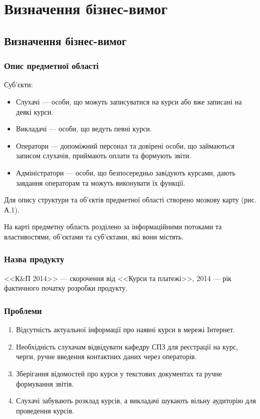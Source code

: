 \newpage
\section{Визначення бізнес-вимог}
\subsection{Визначення бізнес-вимог}
\subsubsection{Опис предметної області}
\bigbreak
Суб'єкти:

\begin{itemize}
\item Слухачі --- особи, що можуть записуватися на курси або вже записані на деякі курси.
\item Викладачі --- особи, що ведуть певні курси.
\item Оператори --- допоміжний персонал та довірені особи, що займаються записом слухачів, приймають оплати та формують звіти.
\item Адміністратори --- особи, що безпосередньо завідують курсами, дають завдання операторам та можуть виконувати їх функції.
\end{itemize}

Для опису структури та об'єктів предметної області створено мозкову карту (рис. А.1).

На карті предметну область розділено за інформаційними потоками та властивостями, об'єктами та суб'єктами, які вони містять.
\bigbreak
\subsubsection{Назва продукту}
\bigbreak
<<К\&П 2014>> --- скорочення від <<Курси та платежі>>, 2014 --- рік фактичного початку розробки продукту.
\bigbreak
\subsubsection{Проблеми}
\bigbreak
\begin{enumerate}
 \item Відсутність актуальної інформації про наявні курси в мережі Інтернет.
 \item Необхідність слухачам відвідувати кафедру СПЗ для реєстрації на курс, черги, ручне введення контактних даних через операторів.
 \item Зберігання відомостей про курси у текстових документах та ручне формування звітів.
 \item Слухачі забувають розклад курсів, а викладачі шукають вільну аудиторію для проведення курсів.
\end{enumerate}
\bigbreak

